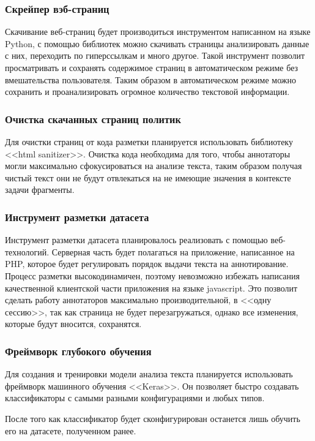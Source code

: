 \documentclass[../main]{subfiles}
\begin{document}
\subsubsection{Скрейпер вэб-страниц}
Скачивание веб-страниц будет производиться инструментом написанном на языке Python, с помощью библиотек можно скачивать страницы анализировать данные с них, переходить по гиперссылкам и много другое. Такой инструмент позволит просматривать и сохранять содержимое страниц в автоматическом режиме без вмешательства пользователя. Таким образом в автоматическом режиме можно сохранить и проанализировать огромное количество текстовой информации.

\subsubsection{Очистка скачанных страниц политик}
Для очистки страниц от кода разметки планируется использовать библиотеку <<html sanitizer>>. Очистка кода необходима для того, чтобы аннотаторы могли максимально сфокусироваться на анализе текста, таким образом получая чистый текст они не будут отвлекаться на не имеющие значения в контексте задачи фрагменты.

\subsubsection{Инструмент разметки датасета}
Инструмент разметки датасета планировалось реализовать с помощью веб-технологий. Серверная часть будет полагаться на приложение, написанное на PHP, которое будет регулировать порядок выдачи текста на аннотирование. Процесс разметки высокодинамичен, поэтому невозможно избежать написания качественной клиентской части приложения на языке javascript. Это позволит сделать работу аннотаторов максимально производительной, в <<одну сессию>>, так как страница не будет перезагружаться, однако все изменения, которые будут вносится, сохранятся.

\subsubsection{Фреймворк глубокого обучения}
Для создания и тренировки модели анализа текста планируется использовать фреймворк машинного обучения <<Keras>>. Он позволяет быстро создавать классификаторы с самыми разными конфигурациями и любых типов.

После того как классификатор будет сконфигурирован останется лишь обучить его на датасете, полученном ранее.
\end{document}

